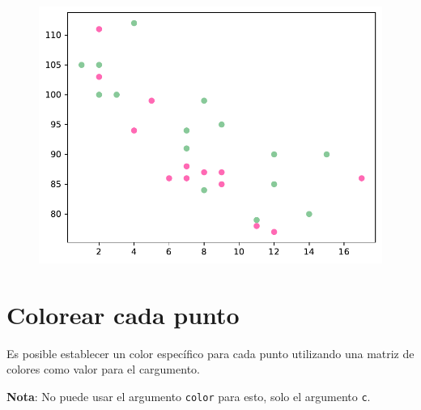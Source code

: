 \begin{code}
\begin{figure}
  \centering
  \includegraphics[scale=0.6]{img/grafica1038.pdf}
\end{figure}
\end{code}

\section{Colorear cada punto}

Es posible establecer un color específico para cada punto utilizando una
matriz de colores como valor para el cargumento.

\textbf{Nota}: No puede usar el argumento \texttt{color} para esto, solo
el argumento \texttt{c}.\\

